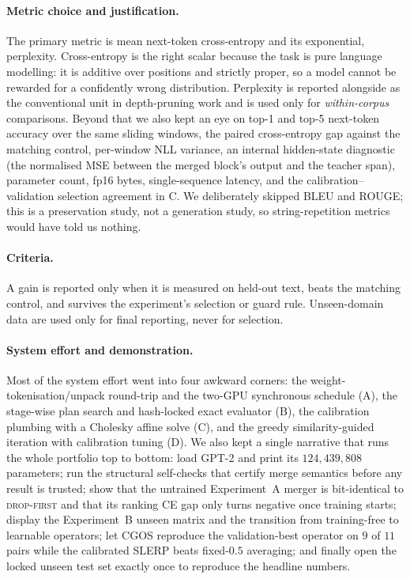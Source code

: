 \documentclass[10pt,a4paper]{article}
\newcommand{\dropfirst}{\textsc{drop-first}}
\begin{document}
\paragraph{Metric choice and justification.} The primary metric is mean
next-token cross-entropy and its exponential, perplexity. Cross-entropy is the
right scalar because the task is pure language modelling: it is additive over
positions and strictly proper, so a model cannot be rewarded for a confidently
wrong distribution. Perplexity is reported alongside as the conventional unit in
depth-pruning work and is used only for \emph{within-corpus} comparisons.
Beyond that we also kept an eye on top-1 and top-5 next-token accuracy over the
same sliding windows, the paired cross-entropy gap against the matching
control, per-window NLL variance, an internal hidden-state diagnostic (the
normalised MSE between the merged block's output and the teacher span),
parameter count, fp16 bytes, single-sequence latency, and the
calibration--validation selection agreement in C. We deliberately skipped BLEU
and ROUGE; this is a preservation study, not a generation study, so
string-repetition metrics would have told us nothing.

\paragraph{Criteria.} A gain is reported only when it is measured on held-out
text, beats the matching control, and survives the experiment's selection or
guard rule. Unseen-domain data are used only for final reporting, never for
selection.

\paragraph{System effort and demonstration.} Most of the system effort went into
four awkward corners: the weight-tokenisation/unpack round-trip and the
two-GPU synchronous schedule (A), the stage-wise plan search and hash-locked
exact evaluator (B), the calibration plumbing with a Cholesky affine solve (C),
and the greedy similarity-guided iteration with calibration tuning (D). We also
kept a single narrative that runs the whole portfolio top to bottom: load GPT-2
and print its $124{,}439{,}808$ parameters; run the structural self-checks that
certify merge semantics before any result is trusted; show that the untrained
Experiment~A merger is bit-identical to \dropfirst{} and that its ranking CE
gap only turns negative once training starts; display the Experiment~B unseen
matrix and the transition from training-free to learnable operators; let CGOS
reproduce the validation-best operator on $9$ of $11$ pairs while the
calibrated SLERP beats fixed-$0.5$ averaging; and finally open the locked
unseen test set exactly once to reproduce the headline numbers.
\end{document}
